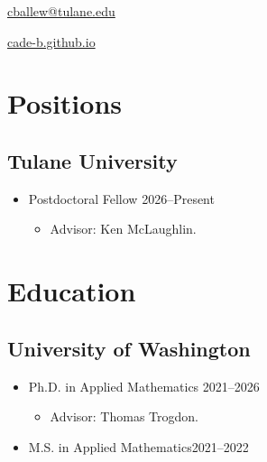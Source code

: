 \documentclass{cv_style}
\begin{document}


    \begin{center}  

\href{mailto:cballew@tulane.edu}{cballew@tulane.edu}

{\href{https://cade-b.github.io/}{cade-b.github.io}}
    
	\end{center}
	

	\section{Positions}
		\subsection{Tulane University}
			\begin{itemize}
				\item Postdoctoral Fellow \hfill
				2026--Present
				\begin{itemize}
					\item Advisor: Ken McLaughlin.
				\end{itemize}
			\end{itemize}

	\section{Education}
		\subsection{University of Washington}
				\begin{itemize}
					\item Ph.D. in Applied Mathematics \hfill
						2021--2026
					\begin{itemize}
					\item Advisor: Thomas Trogdon.
					\end{itemize}
					\item M.S. in Applied Mathematics\hfill 2021--2022
				\end{itemize}
				
\end{document}
